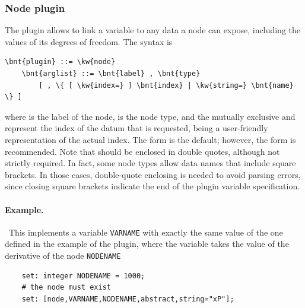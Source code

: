 \subsubsection{Node plugin}
The  plugin allows to link a variable to any data a node
can expose, including the values of its degrees of freedom.
The syntax is
\begin{Verbatim}[commandchars=\\\{\}]
    \bnt{plugin} ::= \kw{node}
    \bnt{arglist} ::= \bnt{label} , \bnt{type}
        [ , \{ [ \kw{index=} ] \bnt{index} | \kw{string=} \bnt{name} \} ]
\end{Verbatim}
where
 is the label of the node,
 is the node type,
and the mutually exclusive  and  represent the index
of the datum that is requested,  being a user-friendly
representation of the actual index.
The  form is the default; however, the  form is recommended.
Note that  should be enclosed in double quotes,
although not strictly required.
In fact, some node types allow data names that include square brackets.
In those cases, double-quote enclosing is needed to avoid parsing errors,
since closing square brackets indicate the end
of the plugin variable specification.

\paragraph{Example.} \
This implements a variable \texttt{VARNAME} with exactly the same value
of the one defined in the example of the \kw{dof} plugin,
where the variable takes the value of the derivative
of the  node \texttt{NODENAME}
\begin{verbatim}
    set: integer NODENAME = 1000;
    # the node must exist
    set: [node,VARNAME,NODENAME,abstract,string="xP"];
\end{verbatim}



